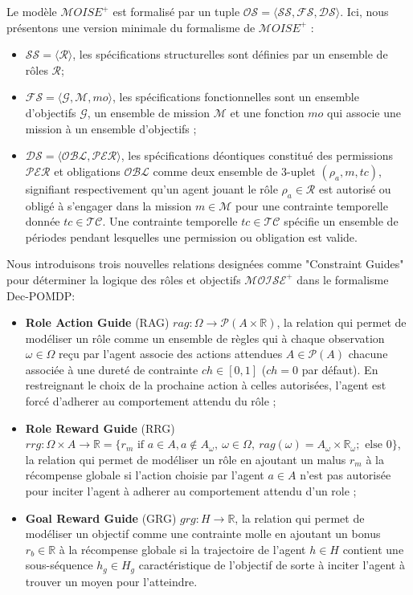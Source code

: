 \documentclass[sigconf,anonymous]{aamas}
\begin{document}
Le modèle $\mathcal{M}OISE^+$ est formalisé par un tuple $\mathcal{OS} = \langle \mathcal{SS}, \mathcal{FS}, \mathcal{DS} \rangle$. Ici, nous présentons une version minimale du formalisme de $\mathcal{M}OISE^+$ :
\begin{itemize}
    \item $\mathcal{SS} = \langle \mathcal{R} \rangle$, les spécifications structurelles sont définies par un ensemble de rôles $\mathcal{R}$;
    \item $\mathcal{FS} = \langle \mathcal{G}, \mathcal{M}, mo \rangle$, les spécifications fonctionnelles sont un ensemble d'objectifs $\mathcal{G}$, un ensemble de mission $\mathcal{M}$ et une fonction $mo$ qui associe une mission à un ensemble d'objectifs ;
    \item $\mathcal{DS} = \langle \mathcal{OBL}, \mathcal{PER} \rangle$, les spécifications déontiques constitué des permissions $\mathcal{PER}$ et obligations $\mathcal{OBL}$ comme deux ensemble de 3-uplet $(\rho_a, m, tc)$, signifiant respectivement qu'un agent jouant le rôle $\rho_a \in \mathcal{R}$ est autorisé ou obligé à s'engager dans la mission $m \in \mathcal{M}$ pour une contrainte temporelle donnée $tc \in \mathcal{TC}$. Une contrainte temporelle $tc \in \mathcal{TC}$ spécifie un ensemble de périodes pendant lesquelles une permission ou obligation est valide.%
\end{itemize}

Nous introduisons trois nouvelles relations designées comme "Constraint Guides" pour déterminer la logique des rôles et objectifs $\mathcal{\mathcal{M}OISE^+}$ dans le formalisme Dec-POMDP:

\begin{itemize}
    \item \textbf{Role Action Guide} (RAG) \quad $rag: \Omega \rightarrow \mathcal{P}(A \times \mathbb{R})$, la relation qui permet de modéliser un rôle comme un ensemble de règles qui à chaque observation $\omega \in \Omega$ reçu par l'agent associe des actions attendues $A \in \mathcal{P}(A)$ chacune associée à une dureté de contrainte $ch \in [0,1]$ ($ch = 0$ par défaut). En restreignant le choix de la prochaine action à celles autorisées, l'agent est forcé d'adherer au comportement attendu du rôle ;
    \item \textbf{Role Reward Guide} (RRG) \quad $rrg: \Omega \times A \to \mathbb{R} = \{r_m \text{ if } a \in A, a \notin A_\omega, \ \omega \in \Omega, \ rag(\omega) = A_\omega \times \mathbb{R_\omega}; \text{ else } 0\}$, la relation qui permet de modéliser un rôle en ajoutant un malus $r_m$ à la récompense globale si l'action choisie par l'agent $a \in A$ n'est pas autorisée pour inciter l'agent à adherer au comportement attendu d'un role ;
    \item \textbf{Goal Reward Guide} (GRG) \quad $grg: H \rightarrow \mathbb{R}$, la relation qui permet de modéliser un objectif comme une contrainte molle en ajoutant un bonus $r_b \in \mathbb{R}$ à la récompense globale si la trajectoire de l'agent $h \in H$ contient une sous-séquence $h_g \in H_g$ caractéristique de l'objectif de sorte à inciter l'agent à trouver un moyen pour l'atteindre.
\end{itemize}
\end{document}
